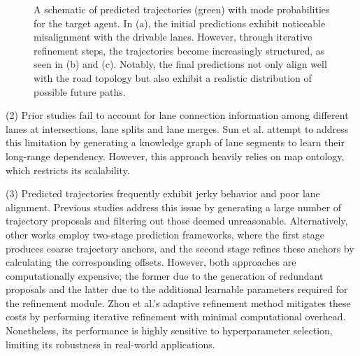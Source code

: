 \begin{figure}
    \caption{A schematic of predicted trajectories (green) with mode probabilities for the target agent. In (a), the initial predictions exhibit noticeable misalignment with the drivable lanes. However, through iterative refinement steps, the trajectories become increasingly structured, as seen in (b) and (c). Notably, the final predictions not only align well with the road topology but also exhibit a realistic distribution of possible future paths. }
    \label{fig:nuScenes_qual}    
\end{figure}

\noindent(2) Prior studies \cite{gao2020vectornet,kim2021lapred,zhou2022hivt,wang2022ltp,liu2024laformer,ngiam2021scene,zhou2023query} fail to account for lane connection information among different lanes at intersections, lane splits and lane merges. Sun et al. \cite{sun2024semanticformer} attempt to address this limitation by generating a knowledge graph of lane segments to learn their long-range dependency. However, this approach heavily relies on map ontology, which restricts its scalability. 

\noindent(3) Predicted trajectories frequently exhibit jerky behavior and poor lane alignment. Previous studies \cite{wang2022ltp,sun2024semanticformer} address this issue by generating a large number of trajectory proposals and filtering out those deemed unreasonable. Alternatively, other works \cite{zhou2023query,liu2024laformer} employ two-stage prediction frameworks, where the first stage produces coarse trajectory anchors, and the second stage refines these anchors by calculating the corresponding offsets. However, both approaches are computationally expensive; the former due to the generation of redundant proposals and the latter due to the additional learnable parameters required for the refinement module. Zhou et al.'s adaptive refinement method \cite{zhou2024smartrefine} mitigates these costs by performing iterative refinement with minimal computational overhead. Nonetheless, its performance is highly sensitive to hyperparameter selection, limiting its robustness in real-world applications.

